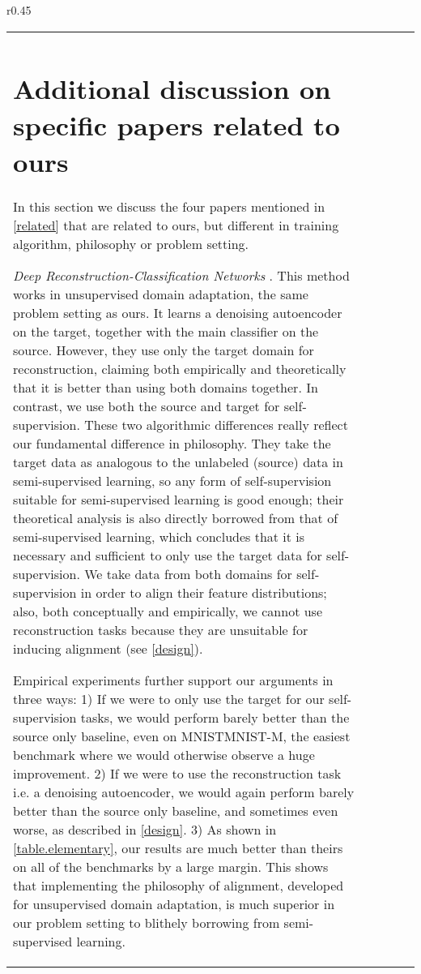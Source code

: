 \documentclass{article} \usepackage{iclr2020_conference,times}
\begin{document}
\begin{wraptable}{r}{0.45\textwidth}
\begin{tabular}{lcccc}
\section{Additional discussion on specific papers related to ours}
\label{more_related}
In this section we discuss the four papers mentioned in \autoref{related} that are related to ours, but different in training algorithm, philosophy or problem setting.

\emph{Deep Reconstruction-Classification Networks} \citep{ghifary2016deep}.
This method works in unsupervised domain adaptation, the same problem setting as ours. It learns a denoising autoencoder on the target, together with the main classifier on the source.
However, they use only the target domain for reconstruction, claiming both empirically and theoretically that it is better than using both domains together.
In contrast, we use both the source and target for self-supervision.
These two algorithmic differences really reflect our fundamental difference in philosophy.
They take the target data as analogous to the unlabeled (source) data in semi-supervised learning, so any form of self-supervision suitable for semi-supervised learning is good enough;
their theoretical analysis is also directly borrowed from that of semi-supervised learning, which concludes that it is necessary and sufficient to only use the target data for self-supervision.
We take data from both domains for self-supervision in order to align their feature distributions;
also, both conceptually and empirically, we cannot use reconstruction tasks because they are unsuitable for inducing alignment (see \autoref{design}).

Empirical experiments further support our arguments in three ways:
1) If we were to only use the target for our self-supervision tasks, we would perform barely better than the source only baseline, even on MNISTMNIST-M, the easiest benchmark where we would otherwise observe a huge improvement.
2) If we were to use the reconstruction task i.e. a denoising autoencoder, we would again perform barely better than the source only baseline, and sometimes even worse, as described in \autoref{design}.
3) As shown in \autoref{table.elementary}, our results are much better than theirs on all of the benchmarks by a large margin. This shows that implementing the philosophy of alignment, developed for unsupervised domain adaptation, is much superior in our problem setting to blithely borrowing from semi-supervised learning.


\end{tabular}
\end{wraptable}
\end{document}
